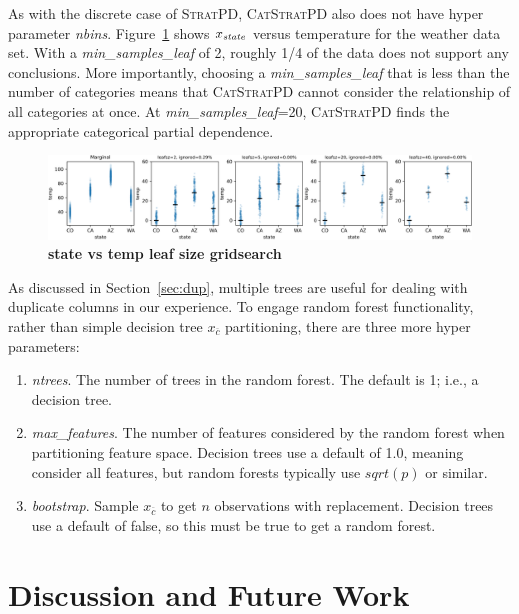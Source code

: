 \documentclass[12pt]{article}
\newcommand{\secref}[1]{Section~\ref{#1}}
\newcommand{\figref}[1]{Figure~\ref{#1}}
\newcommand{\spd}{\fontfamily{cmr}\textsc{\small StratPD}}
\newcommand{\cspd}{\fontfamily{cmr}\textsc{\small CatStratPD}}
\newcommand{\xnc}{$x_{\overline{c}}$}
\begin{document}
As with the discrete case of \spd{}, \cspd{} also does not have hyper parameter {\it nbins}. \figref{fig:weather_grid} shows $x_{\it state}$ versus temperature for the weather data set. With a {\it min\_samples\_leaf} of 2, roughly 1/4 of the data does not support any conclusions. More importantly, choosing a {\it min\_samples\_leaf} that is less than the number of categories means that \cspd{} cannot consider the relationship of all categories at once. At {\it min\_samples\_leaf}=20, \cspd{} finds the appropriate categorical partial dependence.

\begin{figure}[htbp]
\begin{center}
\includegraphics[scale=0.5]{images/state_temp_meta.png}
\caption{{\bf state vs temp leaf size gridsearch}}
\label{fig:weather_grid}
\end{center}
\end{figure}


As discussed in \secref{sec:dup}, multiple trees are useful for dealing with duplicate columns in our experience. To engage random forest functionality, rather than simple decision tree \xnc{} partitioning, there are three more hyper parameters:

\begin{enumerate}
\item {\it ntrees}. The number of trees in the random forest. The default is 1; i.e., a decision tree.
\item {\it max\_features}. The number of features considered by the random forest when partitioning feature space. Decision trees use a default of 1.0, meaning consider all features, but random forests typically use $sqrt(p)$ or similar.
\item {\it bootstrap}.  Sample \xnc{} to get $n$ observations with replacement. Decision trees use a default of false, so this must be true to get a random forest.
\end{enumerate}

\section{Discussion and Future Work}
\end{document}
